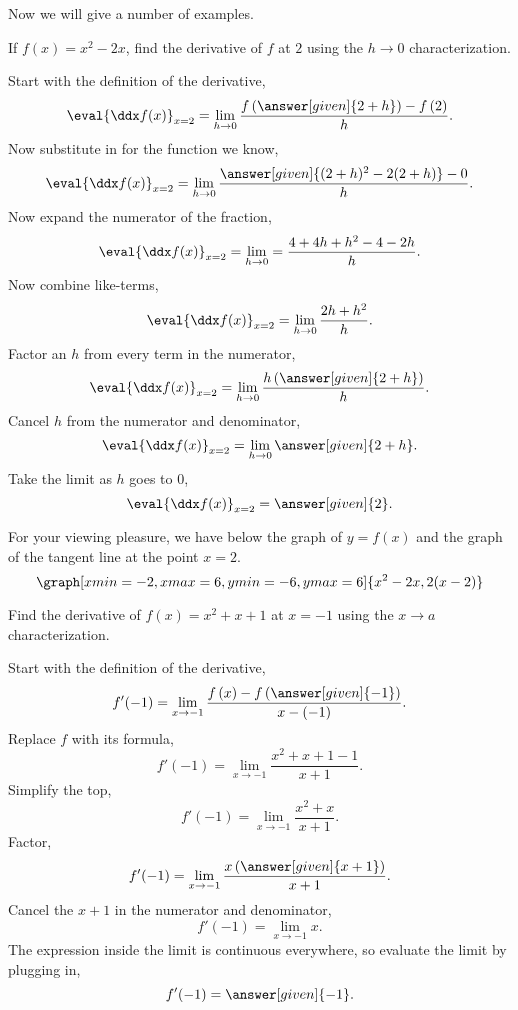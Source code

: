\documentclass{ximera}
\begin{document}
Now we will give a number of examples.
\begin{example}
  If $f(x) = x^2-2x$, find the derivative of $f$ at $2$ using the $h\to0$
  characterization.
  \begin{explanation}
    Start with the definition of the derivative,
    \[
    \eval{\ddx f(x)}_{x=2} = \lim_{h\to 0} \frac{f\left(\answer[given]{2+h}\right)-f\left(2\right)}{h}.
    \] 
     Now substitute in for the function we know,
    \[
    \eval{\ddx f(x)}_{x=2} = \lim_{h\to 0}\frac{\answer[given]{(2+h)^2-2(2+h)} -0}{h}.
    \]
    Now expand the numerator of the fraction,
    \[
    \eval{\ddx f(x)}_{x=2} = \lim_{h\to 0} = \frac{4+4h+h^2-4-2h }{h}.
    \]
    Now combine like-terms,
    \[
    \eval{\ddx f(x)}_{x=2} = \lim_{h\to 0}\frac{2h+h^2}{h}.
    \]
    Factor an $h$ from every term in the numerator,
    \[
    \eval{\ddx f(x)}_{x=2} = \lim_{h\to 0}\frac{h\left(\answer[given]{2+h}\right)}{h}.
    \]
    Cancel $h$ from the numerator and denominator,
    \[
    \eval{\ddx f(x)}_{x=2} = \lim_{h\to 0}\answer[given]{2+h}. 
    \]
    Take the limit as $h$ goes to $0$,
    \[
    \eval{\ddx f(x)}_{x=2} = \answer[given]{2}.
    \]
    \begin{onlineOnly}
    For your viewing pleasure, we have below the graph of $y=f(x)$ and the graph of the tangent line at the point $x=2$. 
    \[
    \graph[xmin=-2,xmax=6,ymin=-6,ymax=6]{x^2-2x, 2(x-2)}
    \]
    \end{onlineOnly}
\end{explanation}
\end{example}

\begin{example}
	Find the derivative of $f(x) = x^2+x+1$ at $x=-1$ using the $x\to a$
	characterization.
	\begin{explanation}
		Start with the definition of the derivative,
		\[
		f'(-1) = \lim_{x\to-1}\frac{f\left(x\right)-f\left(\answer[given]{-1}\right)}{x-(-1)}.
		\] 
		Replace $f$ with its formula,
		\[
		f'(-1) = \lim_{x\to-1}\frac{x^2+x+1 - 1}{x+1}.
		\]
		Simplify the top,
		\[
		f'(-1) = \lim_{x\to-1}\frac{x^2+x}{x+1}.
		\]
		Factor,
		\[
		f'(-1) = \lim_{x\to-1}\frac{x\left(\answer[given]{x+1}\right)}{x+1}.
		\]
		Cancel the $x+1$ in the numerator and denominator,
		\[
		f'(-1) = \lim_{x\to-1}x.
		\]
		The expression inside the limit is continuous everywhere, so
		evaluate the limit by plugging in,
		\[
		f'(-1) = \answer[given]{-1}.
		\]
	\end{explanation}
\end{example}
\end{document}
